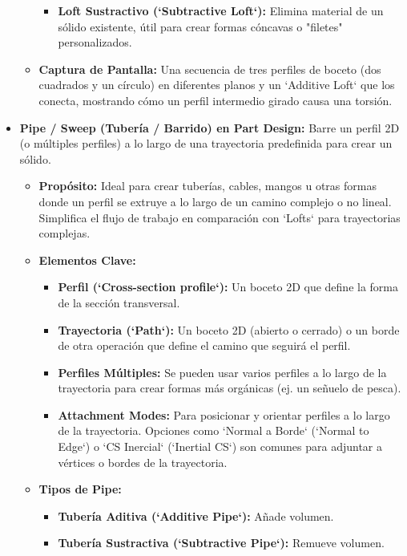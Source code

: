 \documentclass[12pt]{article}
\begin{document}
\begin{itemize}[label=\textbullet]
\begin{itemize}[label=\textendash]
\begin{itemize}[label=\textendash]
            \item \textbf{Loft Sustractivo (`Subtractive Loft`):} Elimina material de un sólido existente, útil para crear formas cóncavas o "filetes" personalizados.
        \end{itemize}
        \item \textbf{Captura de Pantalla:} Una secuencia de tres perfiles de boceto (dos cuadrados y un círculo) en diferentes planos y un `Additive Loft` que los conecta, mostrando cómo un perfil intermedio girado causa una torsión.
    \end{itemize}

    \item \textbf{Pipe / Sweep (Tubería / Barrido) en Part Design:} Barre un perfil 2D (o múltiples perfiles) a lo largo de una trayectoria predefinida para crear un sólido.
    \begin{itemize}[label=\textendash]
        \item \textbf{Propósito:} Ideal para crear tuberías, cables, mangos u otras formas donde un perfil se extruye a lo largo de un camino complejo o no lineal. Simplifica el flujo de trabajo en comparación con `Lofts` para trayectorias complejas.
        \item \textbf{Elementos Clave:}
        \begin{itemize}[label=\textendash]
            \item \textbf{Perfil (`Cross-section profile`):} Un boceto 2D que define la forma de la sección transversal.
            \item \textbf{Trayectoria (`Path`):} Un boceto 2D (abierto o cerrado) o un borde de otra operación que define el camino que seguirá el perfil.
            \item \textbf{Perfiles Múltiples:} Se pueden usar varios perfiles a lo largo de la trayectoria para crear formas más orgánicas (ej. un señuelo de pesca).
            \item \textbf{Attachment Modes:} Para posicionar y orientar perfiles a lo largo de la trayectoria. Opciones como `Normal a Borde` (`Normal to Edge`) o `CS Inercial` (`Inertial CS`) son comunes para adjuntar a vértices o bordes de la trayectoria.
        \end{itemize}
        \item \textbf{Tipos de Pipe:}
        \begin{itemize}[label=\textendash]
            \item \textbf{Tubería Aditiva (`Additive Pipe`):} Añade volumen.
            \item \textbf{Tubería Sustractiva (`Subtractive Pipe`):} Remueve volumen.

\end{itemize}
\end{itemize}
\end{itemize}
\end{document}
